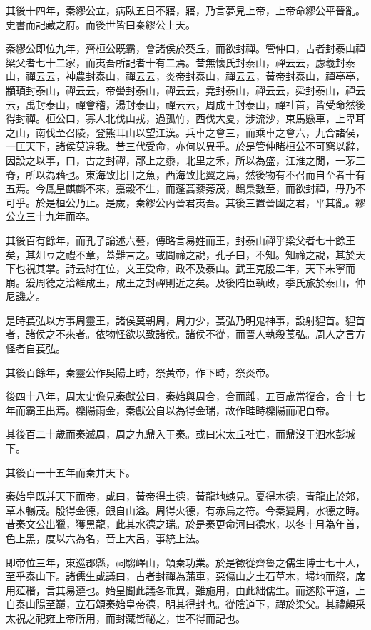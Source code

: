 其後十四年，秦繆公立，病臥五日不寤，寤，乃言夢見上帝，上帝命繆公平晉亂。史書而記藏之府。而後世皆曰秦繆公上天。

秦繆公即位九年，齊桓公既霸，會諸侯於葵丘，而欲封禪。管仲曰，古者封泰山禪梁父者七十二家，而夷吾所記者十有二焉。昔無懷氏封泰山，禪云云，虙羲封泰山，禪云云，神農封泰山，禪云云，炎帝封泰山，禪云云，黃帝封泰山，禪亭亭，顓頊封泰山，禪云云，帝嚳封泰山，禪云云，堯封泰山，禪云云，舜封泰山，禪云云，禹封泰山，禪會稽，湯封泰山，禪云云，周成王封泰山，禪社首，皆受命然後得封禪。桓公曰，寡人北伐山戎，過孤竹，西伐大夏，涉流沙，束馬懸車，上卑耳之山，南伐至召陵，登熊耳山以望江漢。兵車之會三，而乘車之會六，九合諸侯，一匡天下，諸侯莫違我。昔三代受命，亦何以異乎。於是管仲睹桓公不可窮以辭，因設之以事，曰，古之封禪，鄗上之黍，北里之禾，所以為盛，江淮之閒，一茅三脊，所以為藉也。東海致比目之魚，西海致比翼之鳥，然後物有不召而自至者十有五焉。今鳳皇麒麟不來，嘉穀不生，而蓬蒿藜莠茂，鴟梟數至，而欲封禪，毋乃不可乎。於是桓公乃止。是歲，秦繆公內晉君夷吾。其後三置晉國之君，平其亂。繆公立三十九年而卒。

其後百有餘年，而孔子論述六藝，傳略言易姓而王，封泰山禪乎梁父者七十餘王矣，其俎豆之禮不章，蓋難言之。或問禘之說，孔子曰，不知。知禘之說，其於天下也視其掌。詩云紂在位，文王受命，政不及泰山。武王克殷二年，天下未寧而崩。爰周德之洽維成王，成王之封禪則近之矣。及後陪臣執政，季氏旅於泰山，仲尼譏之。

是時萇弘以方事周靈王，諸侯莫朝周，周力少，萇弘乃明鬼神事，設射貍首。貍首者，諸侯之不來者。依物怪欲以致諸侯。諸侯不從，而晉人執殺萇弘。周人之言方怪者自萇弘。

其後百餘年，秦靈公作吳陽上畤，祭黃帝，作下畤，祭炎帝。

後四十八年，周太史儋見秦獻公曰，秦始與周合，合而離，五百歲當復合，合十七年而霸王出焉。櫟陽雨金，秦獻公自以為得金瑞，故作畦畤櫟陽而祀白帝。

其後百二十歲而秦滅周，周之九鼎入于秦。或曰宋太丘社亡，而鼎沒于泗水彭城下。

其後百一十五年而秦并天下。

秦始皇既并天下而帝，或曰，黃帝得土德，黃龍地螾見。夏得木德，青龍止於郊，草木暢茂。殷得金德，銀自山溢。周得火德，有赤烏之符。今秦變周，水德之時。昔秦文公出獵，獲黑龍，此其水德之瑞。於是秦更命河曰德水，以冬十月為年首，色上黑，度以六為名，音上大呂，事統上法。

即帝位三年，東巡郡縣，祠騶嶧山，頌秦功業。於是徵從齊魯之儒生博士七十人，至乎泰山下。諸儒生或議曰，古者封禪為蒲車，惡傷山之土石草木，埽地而祭，席用葅稭，言其易遵也。始皇聞此議各乖異，難施用，由此絀儒生。而遂除車道，上自泰山陽至巔，立石頌秦始皇帝德，明其得封也。從陰道下，禪於梁父。其禮頗采太祝之祀雍上帝所用，而封藏皆祕之，世不得而記也。


